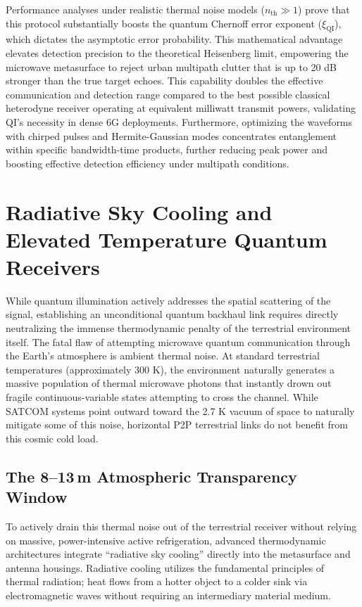 \documentclass[11pt,a4paper]{article}
\begin{document}
Performance analyses under realistic thermal noise models ($n_{\text{th}} \gg 1$) prove that this protocol substantially boosts the quantum Chernoff error exponent ($\xi_{\text{QI}}$), which dictates the asymptotic error probability.\cite{ref33} This mathematical advantage elevates detection precision to the theoretical Heisenberg limit, empowering the microwave metasurface to reject urban multipath clutter that is up to 20 dB stronger than the true target echoes.\cite{ref6} This capability doubles the effective communication and detection range compared to the best possible classical heterodyne receiver operating at equivalent milliwatt transmit powers, validating QI's necessity in dense 6G deployments.\cite{ref6} Furthermore, optimizing the waveforms with chirped pulses and Hermite-Gaussian modes concentrates entanglement within specific bandwidth-time products, further reducing peak power and boosting effective detection efficiency under multipath conditions.\cite{ref33}

\section{Radiative Sky Cooling and Elevated Temperature Quantum Receivers}

While quantum illumination actively addresses the spatial scattering of the signal, establishing an unconditional quantum backhaul link requires directly neutralizing the immense thermodynamic penalty of the terrestrial environment itself. The fatal flaw of attempting microwave quantum communication through the Earth's atmosphere is ambient thermal noise.\cite{ref6} At standard terrestrial temperatures (approximately 300 K), the environment naturally generates a massive population of thermal microwave photons that instantly drown out fragile continuous-variable states attempting to cross the channel.\cite{ref6} While SATCOM systems point outward toward the 2.7 K vacuum of space to naturally mitigate some of this noise, horizontal P2P terrestrial links do not benefit from this cosmic cold load.\cite{ref6}

\subsection{The 8--13\,\textmu m Atmospheric Transparency Window}

To actively drain this thermal noise out of the terrestrial receiver without relying on massive, power-intensive active refrigeration, advanced thermodynamic architectures integrate ``radiative sky cooling'' directly into the metasurface and antenna housings.\cite{ref43} Radiative cooling utilizes the fundamental principles of thermal radiation; heat flows from a hotter object to a colder sink via electromagnetic waves without requiring an intermediary material medium.\cite{ref41}
\end{document}
